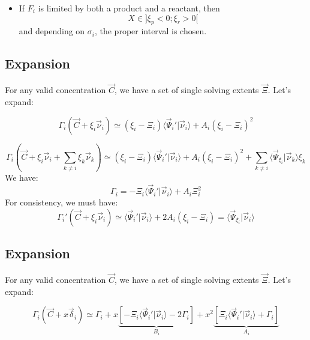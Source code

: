 \documentclass[aps,12pt]{revtex4}
\begin{document}
\begin{itemize}
\begin{itemize}
	\item If $F_i$ is limited by both a product and a reactant, then $$X\in\rbrack \xi_p < 0 ; \xi_r > 0 \lbrack$$
	and depending on $\sigma_i$, the proper interval is chosen.
	\end{itemize}
	
\end{itemize}

\subsection{Expansion}

For any valid concentration $\vec{C}$, we have a set of single solving extents $\vec{\Xi}$.
Let's expand:

\begin{equation}
\Gamma_i(\vec{C} + \xi_i \vec{\nu}_i) \simeq (\xi_i - \Xi_i) \langle \vec{\Psi}_i' \vert \vec{\nu}_i \rangle + A_i (\xi_i - \Xi_i)^2
\end{equation}

\begin{equation}
\Gamma_i(\vec{C} + \xi_i \vec{\nu}_i + \sum_{k\not=i} \xi_k \vec{\nu}_k) \simeq 
(\xi_i - \Xi_i) \langle \vec{\Psi}_i' \vert \vec{\nu}_i \rangle + A_i (\xi_i - \Xi_i)^2 +
\sum_{k\not=i} \langle \vec{\Psi}_{\xi_i} \vert \vec{\nu}_k \rangle \xi_k
\end{equation}
We have:
\begin{equation}
	\Gamma_i = -\Xi_i  \langle \vec{\Psi}_i' \vert \vec{\nu}_i \rangle + A_i \Xi_i^2
\end{equation}
For consistency, we must have:
\begin{equation}
 \Gamma_i'(\vec{C}+\xi_i \vec{\nu}_i) \simeq \langle \vec{\Psi}_i' \vert \vec{\nu}_i \rangle + 2 A_i \left(\xi_i - \Xi_i\right) = 
 \langle \vec{\Psi}_{\xi_i} \vert \vec{\nu}_i \rangle
\end{equation}

\subsection{Expansion}

For any valid concentration $\vec{C}$, we have a set of single solving extents $\vec{\Xi}$.
Let's expand:

\begin{equation}
	\Gamma_i(\vec{C} + x \vec{\delta}_i) \simeq \Gamma_i 
	+ x \underbrace{\left[ -\Xi_i \langle \vec{\Psi}_i' \vert \vec{\nu}_i \rangle - 2 \Gamma_i \right]}_{B_i}
	+ x^2 \underbrace{\left[ \Xi_i \langle \vec{\Psi}_i' \vert \vec{\nu}_i \rangle + \Gamma_i\right]}_{A_i}
\end{equation}
\end{document}
